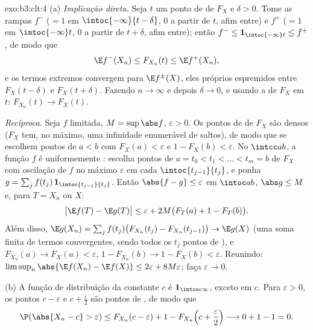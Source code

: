 \begin{solution}{exo:b3:clt:4}
(a) \emph{Implicação direta.} Seja $t$ um ponto de 
de $F_X$ e $\delta > 0$. Tome as rampas 
$f^-$ ($= 1$ em $\intoc{-\infty}{t-\delta}$, $0$ a partir de $t$,
afim entre) e $f^+$ ($= 1$ em $\intoc{-\infty}t$,
$0$ a partir de $t + \delta$, afim entre); então $f^- \leq
\mathbf 1_{\intoc{-\infty}t} \leq f^+$, de modo que
\[
\E f^-(X_n) \leq F_{X_n}(t) \leq \E f^+(X_n),
\]
e os termos extremos convergem para $\E f^\pm(X)$, eles próprios
espremidos entre $F_X(t - \delta)$ e $F_X(t + \delta)$.
Fazendo $n \to \infty$ e depois $\delta \to 0$, e usando a
 de $F_X$ em $t$: $F_{X_n}(t) \to F_X(t)$.

\emph{Recíproca.} Seja $f$  limitada, $M =
\sup\abs f$, $\varepsilon > 0$. Os pontos de  de
$F_X$ são densos ($F_X$ tem, no máximo, uma infinidade enumerável de saltos), de modo que
se escolhem pontos de  $a < b$ com $F_X(a) < \varepsilon$
e $1 - F_X(b) < \varepsilon$. No  $\intcc ab$,
a função $f$ é uniformemente : escolha pontos de 
$a = t_0 < t_1 < \dots < t_m = b$ de $F_X$ com
oscilação de $f$ no máximo $\varepsilon$ em cada
$\intoc{t_{j-1}}{t_j}$, e ponha $g = \sum_j
f(t_j)\,\mathbf 1_{\intoc{t_{j-1}}{t_j}}$. Então $\abs{f - g}
\leq \varepsilon$ em $\intoc ab$, $\abs g \leq M$ e, para
$T = X_n$ ou $X$:
\[
\bigl|\E f(T) - \E g(T)\bigr| \leq \varepsilon +
2M\bigl(F_T(a) + 1 - F_T(b)\bigr).
\]
Além disso, $\E g(X_n) = \sum_j f(t_j)\bigl(F_{X_n}(t_j) -
F_{X_n}(t_{j-1})\bigr) \to \E g(X)$ (uma soma finita de
termos convergentes, sendo todos os $t_j$ pontos de ), e
$F_{X_n}(a) \to F_X(a) < \varepsilon$, $1 - F_{X_n}(b) \to 1
- F_X(b) < \varepsilon$. Reunindo:
$\limsup_n\abs{\E f(X_n) - \E f(X)} \leq 2\varepsilon +
8M\varepsilon$; faça $\varepsilon \to 0$.

(b) A função de distribuição da constante $c$ é
$\mathbf 1_{\intco c\infty}$,  exceto em $c$. Para
$\varepsilon > 0$, os pontos $c - \varepsilon$ e $c +
\frac\varepsilon2$ são pontos de , de modo que
\[
\P(\abs{X_n - c} > \varepsilon) \leq F_{X_n}(c -
\varepsilon) + 1 - F_{X_n}\Bigl(c + \frac\varepsilon2\Bigr)
\longrightarrow 0 + 1 - 1 = 0 .
\]
\end{solution}

